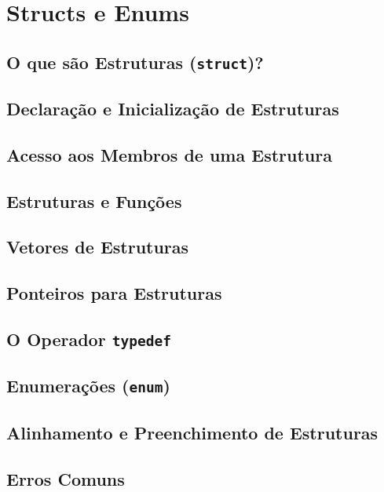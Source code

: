 \chapter{Structs e Enums}

\section{O que são Estruturas (\texttt{struct})?}

\section{Declaração e Inicialização de Estruturas}

\section{Acesso aos Membros de uma Estrutura}

\section{Estruturas e Funções}

\section{Vetores de Estruturas}

\section{Ponteiros para Estruturas}

\section{O Operador \texttt{typedef}}

\section{Enumerações (\texttt{enum})}

\section{Alinhamento e Preenchimento de Estruturas}

\section{Erros Comuns}
